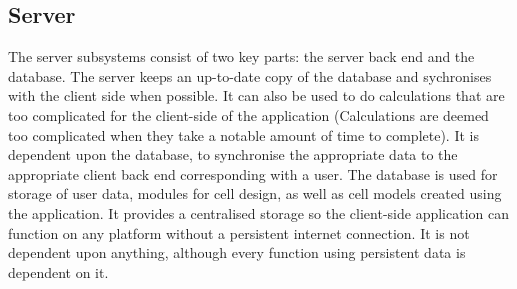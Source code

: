 \documentclass{report}
\begin{document}
			\subsection{Server}
				The server subsystems consist of two key parts: the server back end and the database. The server keeps an up-to-date copy of the database and sychronises with the client side when possible. It can also be used to do calculations that are too complicated for the client-side of the application (Calculations are deemed too complicated when they take a notable amount of time to complete). It is dependent upon the database, to synchronise the appropriate data to the appropriate client back end corresponding with a user.
				The database is used for storage of user data, modules for cell design, as well as cell models created using the application. It provides a centralised storage so the client-side application can function on any platform without a persistent internet connection. It is not dependent upon anything, although every function using persistent data is dependent on it.	\\
\end{document}
